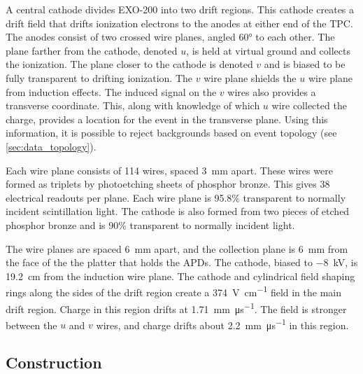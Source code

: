 \documentclass[herrin-thesis.tex]{subfiles}
\begin{document}
A central cathode divides EXO-200 into two drift regions. This cathode creates a drift field that drifts ionization electrons to the anodes at either end of the TPC. The anodes consist of two crossed wire planes, angled \ang{60} to each other. The plane farther from the cathode, denoted \(u\), is held at virtual ground and collects the ionization. The plane closer to the cathode is denoted \(v\) and is biased to be fully transparent to drifting ionization. The \(v\) wire plane shields the \(u\) wire plane from induction effects. The induced signal on the \(v\) wires also provides a transverse coordinate. This, along with knowledge of which \(u\) wire collected the charge, provides a location for the event in the transverse plane. Using this information, it is possible to reject backgrounds based on event topology (see \cref{sec:data_topology}).

Each wire plane consists of 114 wires, spaced \SI{3}{\mm} apart. These wires were formed as triplets by photoetching sheets of phosphor bronze. This gives 38 electrical readouts per plane. Each wire plane is 95.8\% transparent to normally incident scintillation light. The cathode is also formed from two pieces of etched phosphor bronze and is 90\% transparent to normally incident light.

The wire planes are spaced \SI{6}{\mm} apart, and the collection plane is \SI{6}{\mm} from the face of the the platter that holds the APDs. The cathode, biased to \SI{-8}{\kV}, is \SI{19.2}{\cm} from the induction wire plane. The cathode and cylindrical field shaping rings along the sides of the drift region create a \SI{374}{\V\per\cm} field in the main drift region. Charge in this region drifts at \SI{1.71}{\mm\per\micro\s}. The field is stronger between the \(u\) and \(v\) wires, and charge drifts about \SI{2.2}{\mm\per\micro\s} in this region.

\subsection{Construction}
\end{document}
